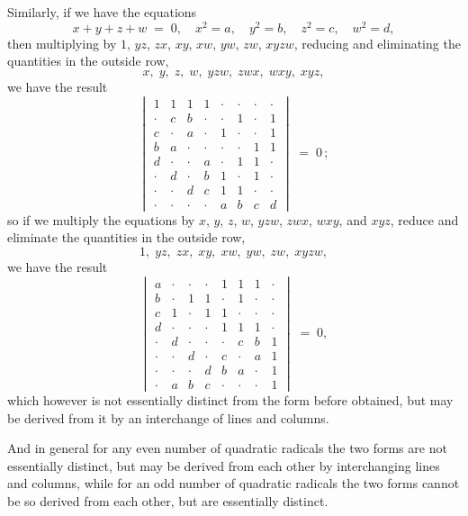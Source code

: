 \documentclass[11pt]{article}
\begin{document}
Similarly, if we have the equations
\[
x + y + z + w \;=\; 0,\quad x^{2} = a,\quad y^{2} = b,\quad z^{2} = c,\quad w^{2} = d,
\]
then multiplying by $1$, $yz$, $zx$, $xy$, $xw$, $yw$, $zw$, $xyzw$, reducing and eliminating the quantities in the outside row,
\[
x,\; y,\; z,\; w,\; yzw,\; zwx,\; wxy,\; xyz,
\]
we have the result
\[
\begin{vmatrix}
1 & 1 & 1 & 1 & \cdot & \cdot & \cdot & \cdot \\
\cdot & c & b & \cdot & \cdot & 1 & \cdot & 1 \\
c & \cdot & a & \cdot & 1 & \cdot & \cdot & 1 \\
b & a & \cdot & \cdot & \cdot & \cdot & 1 & 1 \\
d & \cdot & \cdot & a & \cdot & 1 & 1 & \cdot \\
\cdot & d & \cdot & b & 1 & \cdot & 1 & \cdot \\
\cdot & \cdot & d & c & 1 & 1 & \cdot & \cdot \\
\cdot & \cdot & \cdot & \cdot & a & b & c & d
\end{vmatrix} \;=\; 0\,;
\]
so if we multiply the equations by $x$, $y$, $z$, $w$, $yzw$, $zwx$, $wxy$, and $xyz$, reduce and eliminate the quantities in the outside row,
\[
1,\; yz,\; zx,\; xy,\; xw,\; yw,\; zw,\; xyzw,
\]
we have the result
\[
\begin{vmatrix}
a & \cdot & \cdot & \cdot & 1 & 1 & 1 & \cdot \\
b & \cdot & 1 & 1 & \cdot & 1 & \cdot & \cdot \\
c & 1 & \cdot & 1 & 1 & \cdot & \cdot & \cdot \\
d & \cdot & \cdot & \cdot & 1 & 1 & 1 & \cdot \\
\cdot & d & \cdot & \cdot & \cdot & c & b & 1 \\
\cdot & \cdot & d & \cdot & c & \cdot & a & 1 \\
\cdot & \cdot & \cdot & d & b & a & \cdot & 1 \\
\cdot & a & b & c & \cdot & \cdot & \cdot & 1
\end{vmatrix} \;=\; 0,
\]
which however is not essentially distinct from the form before obtained, but may be derived from it by an interchange of lines and columns.

And in general for any even number of quadratic radicals the two forms are not essentially distinct, but may be derived from each other by interchanging lines and columns, while for an odd number of quadratic radicals the two forms cannot be so derived from each other, but are essentially distinct.
\end{document}
